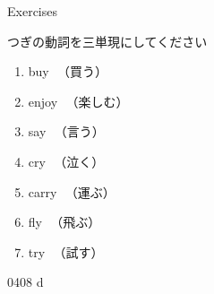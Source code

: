 \documentclass[aspectratio=169,xcolor={dvipsnames,table}]{beamer}
\newcommand{\myaudio}[1]{\href{#1}{\faVolumeUp}}
\begin{document}
\begin{frame}[plain]{Exercises}

  つぎの動詞を三単現にしてください

  \Large
  \begin{enumerate}
    \item buy\,\,\,\,{\small {}（買う）}\hfill{}\hspace{200pt}\mbox{}
    \item enjoy\,\,\,\,{\small {}（楽しむ）}\hfill{}\hspace{200pt}\mbox{}
    \item say\,\,\,\,{\small {}（言う）}\hfill{}\,\,\,\hspace{160pt}\mbox{}
    \item cry\,\,\,\,{\small {}（泣く）}\hfill{}\hspace{200pt}\mbox{}
    \item carry\,\,\,\,{\small {}（運ぶ）}\hfill{}\hspace{200pt}\mbox{}
    \item fly\,\,\,\,{\small {}（飛ぶ）}\hfill{}\hspace{200pt}\mbox{}
    \item try\,\,\,\,{\small {}（試す）}\hfill{}\hspace{200pt}\mbox{}
  \end{enumerate}

  \hfill{\tiny 0408}\,{\scriptsize \myaudio{./audio/005_singular_plural_d.mp3}}\,{\tiny d}


\end{frame}
\end{document}
